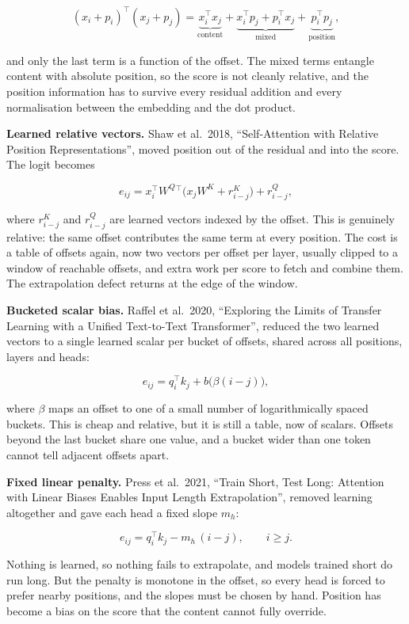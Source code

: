 \[
(x_i + p_i)^{\top} (x_j + p_j) = \underbrace{x_i^{\top} x_j}_{\text{content}}
+ \underbrace{x_i^{\top} p_j + p_i^{\top} x_j}_{\text{mixed}}
+ \underbrace{p_i^{\top} p_j}_{\text{position}},
\]

and only the last term is a function of the offset. The mixed terms
entangle content with absolute position, so the score is not cleanly
relative, and the position information has to survive every residual
addition and every normalisation between the embedding and the dot
product.

\textbf{Learned relative vectors.} Shaw et al.~2018, ``Self-Attention
with Relative Position Representations'', moved position out of the
residual and into the score. The logit becomes

\[
e_{ij} = x_i^{\top} W^Q {}^{\top} \big( x_j W^K + r^K_{i-j} \big) + r^Q_{i-j},
\]

where \(r^K_{i-j}\) and \(r^Q_{i-j}\) are learned vectors indexed by the
offset. This is genuinely relative: the same offset contributes the same
term at every position. The cost is a table of offsets again, now two
vectors per offset per layer, usually clipped to a window of reachable
offsets, and extra work per score to fetch and combine them. The
extrapolation defect returns at the edge of the window.

\textbf{Bucketed scalar bias.} Raffel et al.~2020, ``Exploring the
Limits of Transfer Learning with a Unified Text-to-Text Transformer'',
reduced the two learned vectors to a single learned scalar per bucket of
offsets, shared across all positions, layers and heads:

\[
e_{ij} = q_i^{\top} k_j + b\big(\beta(i - j)\big),
\]

where \(\beta\) maps an offset to one of a small number of
logarithmically spaced buckets. This is cheap and relative, but it is
still a table, now of scalars. Offsets beyond the last bucket share one
value, and a bucket wider than one token cannot tell adjacent offsets
apart.

\textbf{Fixed linear penalty.} Press et al.~2021, ``Train Short, Test
Long: Attention with Linear Biases Enables Input Length Extrapolation'',
removed learning altogether and gave each head a fixed slope \(m_h\):

\[
e_{ij} = q_i^{\top} k_j - m_h \,(i - j), \qquad i \ge j .
\]

Nothing is learned, so nothing fails to extrapolate, and models trained
short do run long. But the penalty is monotone in the offset, so every
head is forced to prefer nearby positions, and the slopes must be chosen
by hand. Position has become a bias on the score that the content cannot
fully override.

